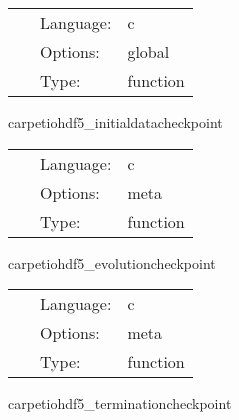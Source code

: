 \documentclass{article}
\begin{document}
\hspace{5mm}{\it initialisation of checkpointing intervals after recovery } 


\hspace{5mm}

 \begin{tabular*}{160mm}{cll} 
~ & Language:  & c \\ 
~ & Options:  & global \\ 
~ & Type:  & function \\ 
\end{tabular*} 


\vspace{5mm}


\hspace{5mm} carpetiohdf5\_initialdatacheckpoint 

\hspace{5mm}{\it initial data checkpoint routine } 


\hspace{5mm}

 \begin{tabular*}{160mm}{cll} 
~ & Language:  & c \\ 
~ & Options:  & meta \\ 
~ & Type:  & function \\ 
\end{tabular*} 


\vspace{5mm}


\hspace{5mm} carpetiohdf5\_evolutioncheckpoint 

\hspace{5mm}{\it evolution checkpoint routine } 


\hspace{5mm}

 \begin{tabular*}{160mm}{cll} 
~ & Language:  & c \\ 
~ & Options:  & meta \\ 
~ & Type:  & function \\ 
\end{tabular*} 


\vspace{5mm}


\hspace{5mm} carpetiohdf5\_terminationcheckpoint 
\end{document}
